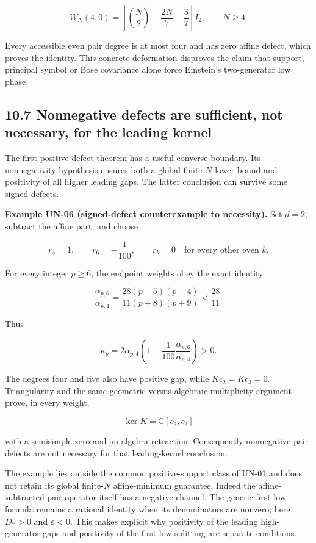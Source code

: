 \documentclass[a4paper,11pt]{article}
\numberwithin{equation}{section}
\begin{document}
\[
W_N(4,0)=
\left[\binom N2-\frac{2N}{7}-\frac37\right]I_2,
\qquad N\geq4.
\]

Every accessible even pair degree is at most four and has zero affine defect, which proves the identity. This concrete deformation disproves the claim that support, principal symbol or Bose covariance alone force Einstein's two-generator low phase.

\hypertarget{nonnegative-defects-are-sufficient-not-necessary-for-the-leading-kernel}{%
\subsection{10.7 Nonnegative defects are sufficient, not necessary, for the leading kernel}\label{nonnegative-defects-are-sufficient-not-necessary-for-the-leading-kernel}}

The first-positive-defect theorem has a useful converse boundary. Its nonnegativity hypothesis ensures both a global finite-\(N\) lower bound and positivity of all higher leading gaps. The latter conclusion can survive some signed defects.

\textbf{Example UN-06 (signed-defect counterexample to necessity).} Set \(d=2\), subtract the affine part, and choose

\[
r_4=1,\qquad r_6=-\frac1{100},\qquad
r_k=0\quad\text{for every other even }k.
\]

For every integer \(p\geq6\), the endpoint weights obey the exact identity

\[
\frac{\alpha_{p,6}}{\alpha_{p,4}}
=\frac{28(p-5)(p-4)}{11(p+8)(p+9)}
<\frac{28}{11}.
\]

Thus

\[
\kappa_p=2\alpha_{p,4}
\left(1-\frac1{100}\frac{\alpha_{p,6}}{\alpha_{p,4}}\right)>0.
\]

The degrees four and five also have positive gap, while \(Kc_2=Kc_3=0\). Triangularity and the same geometric-versus-algebraic multiplicity argument prove, in every weight,

\[
\ker K=\mathbb C[c_2,c_3]
\]

with a semisimple zero and an algebra retraction. Consequently nonnegative pair defects are not necessary for that leading-kernel conclusion.

The example lies outside the common positive-support class of UN-01 and does not retain its global finite-\(N\) affine-minimum guarantee. Indeed the affine-subtracted pair operator itself has a negative channel. The generic first-low formula remains a rational identity when its denominators are nonzero; here \(D_*>0\) and \(\varepsilon<0\). This makes explicit why positivity of the leading high-generator gaps and positivity of the first low splitting are separate conditions.
\end{document}
